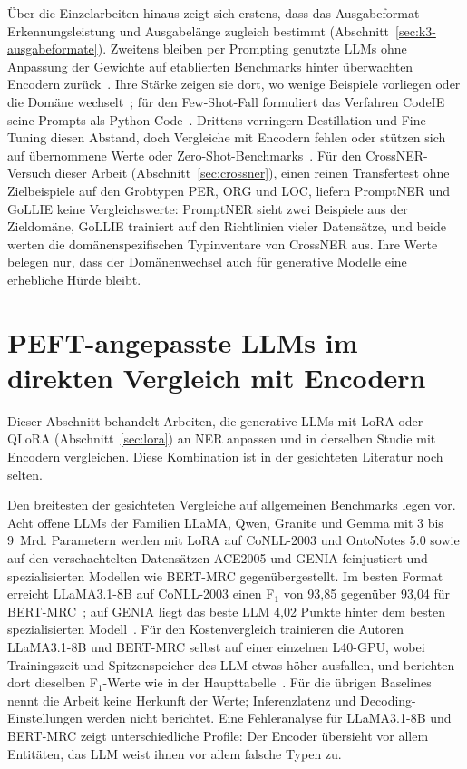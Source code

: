 Über die Einzelarbeiten hinaus zeigt sich erstens, dass das
Ausgabeformat Erkennungsleistung und Ausgabelänge zugleich bestimmt
(Abschnitt~\ref{sec:k3-ausgabeformate}).
Zweitens bleiben per Prompting genutzte LLMs ohne Anpassung der Gewichte
auf etablierten Benchmarks hinter überwachten Encodern
zurück~\cite{wang2025gptner,xie2023zeroshot}.
Ihre Stärke zeigen sie dort, wo wenige Beispiele vorliegen oder die Domäne
wechselt~\cite{wang2025gptner,ashok2023promptner}; für den Few-Shot-Fall
formuliert das Verfahren CodeIE seine Prompts als
Python-Code~\cite{li2023codeie}.
Drittens verringern Destillation und Fine-Tuning diesen Abstand, doch
Vergleiche mit Encodern fehlen oder stützen sich auf übernommene Werte
oder Zero-Shot-Benchmarks~\cite{zhou2024universalner,sainz2024gollie}.
Für den CrossNER-Versuch dieser Arbeit
(Abschnitt~\ref{sec:crossner}), einen reinen Transfertest ohne
Zielbeispiele auf den Grobtypen PER, ORG und LOC, liefern PromptNER und
GoLLIE keine Vergleichswerte: PromptNER sieht zwei Beispiele aus der
Zieldomäne, GoLLIE trainiert auf den Richtlinien vieler Datensätze, und
beide werten die domänenspezifischen Typinventare von CrossNER aus.
Ihre Werte belegen nur, dass der Domänenwechsel auch für generative
Modelle eine erhebliche Hürde bleibt.

\section[PEFT-angepasste LLMs im direkten Vergleich mit Encodern]{PEFT-angepasste LLMs im direkten \mbox{Vergleich} mit Encodern}
\label{sec:peft_ner_related}

Dieser Abschnitt behandelt Arbeiten, die generative LLMs mit LoRA oder
QLoRA (Abschnitt~\ref{sec:lora}) an NER anpassen und in derselben Studie
mit Encodern vergleichen.
Diese Kombination ist in der gesichteten Literatur noch selten.

Den breitesten der gesichteten Vergleiche auf allgemeinen Benchmarks
legen
\textcite{zhan2026generativeNER} vor.
Acht offene LLMs der Familien LLaMA, Qwen, Granite und Gemma mit 3 bis
9~Mrd. Parametern werden mit LoRA auf CoNLL-2003 und OntoNotes 5.0 sowie
auf den verschachtelten Datensätzen ACE2005 und GENIA feinjustiert und
spezialisierten Modellen wie BERT-MRC gegenübergestellt.
Im besten Format erreicht LLaMA3.1-8B auf CoNLL-2003 einen F$_1$ von
93{,}85 gegenüber 93{,}04 für BERT-MRC~\cite[Tab.~3]{zhan2026generativeNER};
auf GENIA liegt das beste LLM 4{,}02 Punkte hinter dem besten
spezialisierten Modell~\cite[Abschn.~3.2, Tab.~4]{zhan2026generativeNER}.
Für den Kostenvergleich trainieren die Autoren LLaMA3.1-8B und BERT-MRC
selbst auf einer einzelnen L40-GPU, wobei Trainingszeit und
Spitzenspeicher des LLM etwas höher ausfallen, und berichten dort
dieselben F$_1$-Werte wie in der
Haupttabelle~\cite[Anh.~G, Tab.~13]{zhan2026generativeNER}.
Für die übrigen Baselines nennt die Arbeit keine Herkunft der Werte;
Inferenzlatenz und Decoding-Einstellungen werden nicht berichtet.
Eine Fehleranalyse für LLaMA3.1-8B und BERT-MRC zeigt unterschiedliche
Profile: Der Encoder übersieht vor allem Entitäten, das LLM weist ihnen
vor allem falsche Typen zu.

